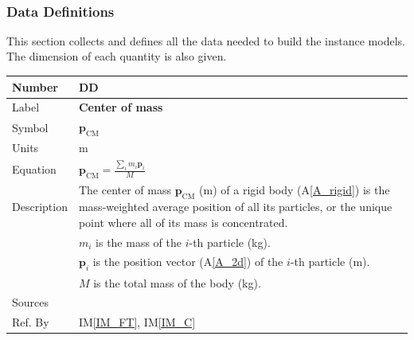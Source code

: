 \documentclass[12pt]{article}
\newcommand{\colAwidth}{0.13\textwidth}
\newcommand{\colBwidth}{0.82\textwidth}
\newcounter{defnum} %
\newcounter{datadefnum} %
\newcommand{\aref}[1]{A\ref{#1}}
\begin{document}
~\newpage

\subsubsection{Data Definitions}\label{sec_datadef}

This section collects and defines all the data needed to build the instance
models. The dimension of each quantity is also given. \\


\noindent
\begin{minipage}{\textwidth}
	\renewcommand*{\arraystretch}{1.5}
	\begin{tabular}{| p{\colAwidth} | p{\colBwidth} |}
		\hline
		\rowcolor[gray]{0.9}
		Number & DD{datadefnum}\thedatadefnum \label{DD_CM}\\
		\hline
		Label & \textbf{Center of mass} \\
		\hline
		Symbol & $\mathbf{p}_\mathrm{CM}$ \\
		\hline
		Units & \si{\metre} \\
		\hline
		Equation &  $\mathbf{p}_\mathrm{CM} = \frac{\sum_i m_i\mathbf{p}_i}{M}$ \\
		\hline
		Description & The center of mass $\mathbf{p}_\mathrm{CM}$ (\si{\metre}) of a rigid body (\aref{A_rigid}) is the mass-weighted average position of all its particles, or the unique point where all of its mass is concentrated. \\
		& $m_i$ is the mass of the $i$-th particle (\si{\kilogram}). \\
		& $\mathbf{p}_i$ is the position vector (\aref{A_2d}) of the $i$-th particle (\si{\metre}). \\
		& $M$ is the total mass of the body (\si{\kilogram}). \\
		\hline
		Sources & \\
		\hline
		Ref. By & IM\ref{IM_FT}, IM\ref{IM_C} \\
		\hline
	\end{tabular}
\end{minipage}

~\newline
\end{document}
